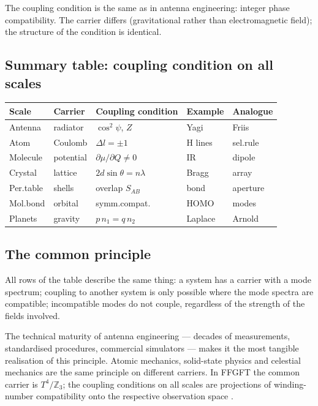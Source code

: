 The coupling condition is the same as in antenna engineering: integer phase
compatibility. The carrier differs (gravitational rather than electromagnetic
field); the structure of the condition is identical.

\subsection*{Summary table: coupling condition on all scales}

\begin{center}
\begin{tabular}{@{}llp{2.2cm}p{1.8cm}p{2cm}@{}}
\toprule
\textbf{Scale} & \textbf{Carrier} & \textbf{Coupling condition}
  & \textbf{Example} & \textbf{Analogue} \\
\midrule
Antenna & radiator & $\cos^2\psi$, $Z$ & Yagi & Friis \\
Atom & Coulomb & $\Delta l=\pm1$ & H lines & sel.rule \\
Molecule & potential & $\partial\mu/\partial Q\neq0$ & IR & dipole \\
Crystal & lattice & $2d\sin\theta=n\lambda$ & Bragg & array \\
Per.table & shells & overlap $S_{AB}$ & bond & aperture \\
Mol.bond & orbital & symm.compat. & HOMO & modes \\
Planets & gravity & $p\,n_1=q\,n_2$ & Laplace & Arnold \\
\bottomrule
\end{tabular}
\end{center}

\subsection*{The common principle}

All rows of the table describe the same thing: a system has a carrier with
a mode spectrum; coupling to another system is only possible where the mode
spectra are compatible; incompatible modes do not couple, regardless of the
strength of the fields involved.

The technical maturity of antenna engineering --- decades of measurements,
standardised procedures, commercial simulators --- makes it the most
tangible realisation of this principle. Atomic mechanics, solid-state
physics and celestial mechanics are the same principle on different carriers.
In FFGFT the common carrier is $T^4/\mathbb{Z}_3$; the coupling conditions
on all scales are projections of winding-number compatibility onto the
respective observation space \SM.

